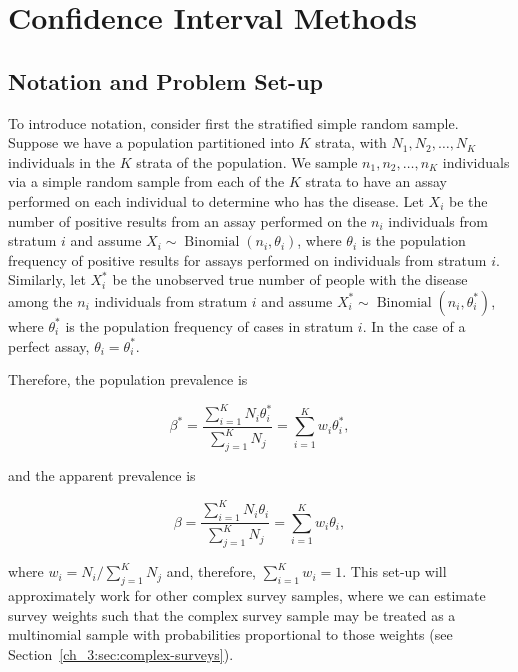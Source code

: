 \section{Confidence Interval Methods}

\subsection{Notation and Problem Set-up}
\label{ch_3:sec-notation}


To introduce notation, consider first the stratified simple random sample.
Suppose we have a population partitioned into \( K \) strata, with \( N_1, N_2, \ldots, N_K \) individuals in the \( K \) strata of the population.
We sample \( n_1, n_2, \ldots, n_K \) individuals via a simple random sample from each of the \( K \) strata to have an assay performed on each individual to determine who has the disease.
Let \( X_i \) be the number of positive results from an assay performed on the \( n_i \) individuals from stratum \( i \) and assume \( X_i \sim \operatorname{Binomial}(n_i, \theta_i) \), where \( \theta_i \) is the population frequency of positive results for assays performed on individuals from stratum \( i \).
Similarly, let \( X_i^* \) be the unobserved true number of people with the disease among the \( n_i \) individuals from stratum \( i \) and assume \( X_i^* \sim \operatorname{Binomial}(n_i, \theta_i^*) \), where \( \theta_i^* \) is the population frequency of cases in stratum \( i \).
In the case of a perfect assay, \( \theta_i = \theta_i^* \).




Therefore, the population prevalence is

\begin{equation}
    \beta^* = \frac{\sum_{i=1}^K N_i \theta_i^*}{\sum_{j=1}^K N_j} = \sum_{i=1}^K w_i \theta_i^*,
    \label{ch_3:eq:pop-prev}
\end{equation}

and the apparent prevalence is

\begin{equation}
    \beta = \frac{\sum_{i=1}^K N_i \theta_i}{\sum_{j=1}^K N_j} = \sum_{i=1}^K w_i \theta_i,
    \label{ch_3:eq:app-prev}
\end{equation}

where \( w_i = N_i / \sum_{j=1}^K N_j \) and, therefore, \( \sum_{i=1}^K w_i = 1 \).
This set-up will approximately work for other complex survey samples, where we can estimate survey weights such that the complex survey sample may be treated as a multinomial sample with probabilities proportional to those weights (see Section~\ref{ch_3:sec:complex-surveys}).

